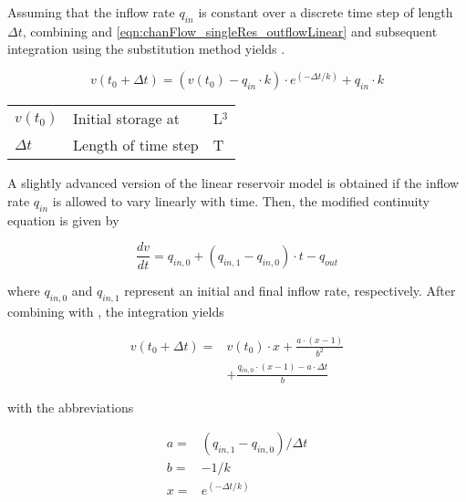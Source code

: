 Assuming that the inflow rate $q_{in}$ is constant over a discrete time step of length $\Delta t$, combining  and \ref{eqn:chanFlow_singleRes_outflowLinear} and subsequent integration using the substitution method yields .

\begin{equation} \label{eqn:chanFlow_singleRes_linResSolution_QinConst}
  v(t_0 + \Delta t) =  (v(t_0) - q_{in} \cdot k) \cdot e^{(-\Delta t / k)} + q_{in} \cdot k
\end{equation}
\medskip
\begin{tabular}{lll}
  $v(t_0)$ & Initial storage at & L$^3$ \\
  $\Delta t$ & Length of time step & T \\
\end{tabular}

A slightly advanced version of the linear reservoir model is obtained if the inflow rate $q_{in}$ is allowed to vary linearly with time. Then, the modified continuity equation is given by 

\begin{equation} \label{eqn:chanFlow_singleRes_continuity_QinLinear}
  \frac{dv}{dt} = q_{in,0} + (q_{in,1} - q_{in,0}) \cdot t - q_{out}
\end{equation}

where $q_{in,0}$ and $q_{in,1}$ represent an initial and final inflow rate, respectively. After combining  with , the integration yields 

\begin{align} \label{eqn:chanFlow_singleRes_linResSolution_QinLinear}
  v(t_0 + \Delta t) =  & v(t_0) \cdot x + \frac{a \cdot (x-1)}{b^2} \\
                       & + \frac{q_{in,0} \cdot (x-1) - a \cdot \Delta t}{b} \nonumber
\end{align}

with the abbreviations

\begin{align*}
  a= & (q_{in,1} - q_{in,0}) / \Delta t \\ \nonumber
  b= & -1/k \\ \nonumber
  x= & e^{(-\Delta t / k)} \nonumber
\end{align*}

